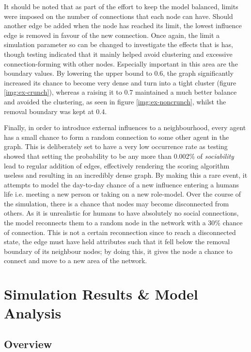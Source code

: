 \documentclass[]{report}
\begin{document}
It should be noted that as part of the effort to keep the model balanced, limits were imposed on the number of connections that each node can have. Should another edge be added when the node has reached its limit, the lowest influence edge is removed in favour of the new connection. Once again, the limit a simulation parameter so can be changed to investigate the effects that is has, though testing indicated that it mainly helped avoid clustering and excessive connection-forming with other nodes. Especially important in this area are the boundary values. By lowering the upper bound to 0.6, the graph significantly increased its chance to become very dense and turn into a tight cluster  (figure \ref{img:ex-crunch}), whereas a raising it to 0.7 maintained a much better balance and avoided the clustering, as seen in figure \ref{img:ex-noncrunch}, whilst the removal boundary was kept at 0.4.

Finally, in order to introduce external influences to a neighbourhood, every agent has a small chance to form a random connection to some other agent in the graph. This is deliberately set to have a very low occurrence rate as testing showed that setting the probability to be any more than 0.002\% of \emph{sociability} lead to regular addition of edges, effectively rendering the scoring algorithm useless and resulting in an incredibly dense graph. By making this a rare event, it attempts to model the day-to-day chance of a new influence entering a humans life i.e. meeting a new person or taking on a new role-model. Over the course of the simulation, there is a chance that nodes may become disconnected from others. As it is unrealistic for humans to have absolutely no social connections, the model reconnects them to a random node in the network with a 30\% chance of connection. This is not a certain reconnection since to reach a disconnected state, the edge must have held attributes such that it fell below the removal boundary of its neighbour nodes; by doing this, it gives the node a chance to connect and move to a new area of the network.

%
%

%
%
\chapter{Simulation Results \& Model Analysis}
\label{sec:analysis}
\section{Overview}
\end{document}
